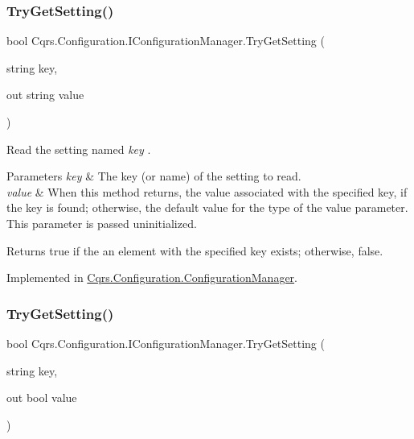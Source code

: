 \subsubsection{\texorpdfstring{Try\+Get\+Setting()}{TryGetSetting()}\hspace{0.1cm}{\footnotesize\ttfamily [1/2]}}
{\footnotesize\ttfamily bool Cqrs.\+Configuration.\+I\+Configuration\+Manager.\+Try\+Get\+Setting (\begin{DoxyParamCaption}\item[{string}]{key,  }\item[{out string}]{value }\end{DoxyParamCaption})}



Read the setting named {\itshape key} . 


\begin{DoxyParams}{Parameters}
{\em key} & The key (or name) of the setting to read.\\
\hline
{\em value} & When this method returns, the value associated with the specified key, if the key is found; otherwise, the default value for the type of the value parameter. This parameter is passed uninitialized.\\
\hline
\end{DoxyParams}
\begin{DoxyReturn}{Returns}
true if the an element with the specified key exists; otherwise, false.
\end{DoxyReturn}


Implemented in \hyperlink{classCqrs_1_1Configuration_1_1ConfigurationManager_ad87af2a011af065d6d3e0d2ff01c7f6e_ad87af2a011af065d6d3e0d2ff01c7f6e}{Cqrs.\+Configuration.\+Configuration\+Manager}.

\mbox{\label{interfaceCqrs_1_1Configuration_1_1IConfigurationManager_a8389181330999fcb8e30af4dbb56d35e_a8389181330999fcb8e30af4dbb56d35e}} 
\subsubsection{\texorpdfstring{Try\+Get\+Setting()}{TryGetSetting()}\hspace{0.1cm}{\footnotesize\ttfamily [2/2]}}
{\footnotesize\ttfamily bool Cqrs.\+Configuration.\+I\+Configuration\+Manager.\+Try\+Get\+Setting (\begin{DoxyParamCaption}\item[{string}]{key,  }\item[{out bool}]{value }\end{DoxyParamCaption})}



